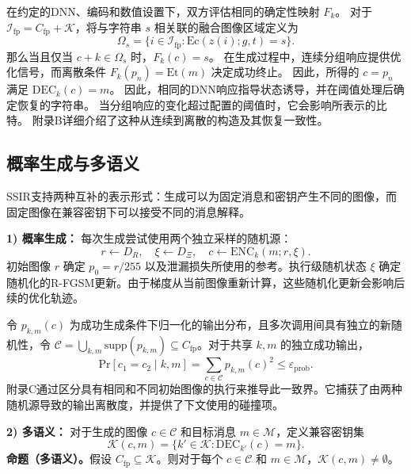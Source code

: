\documentclass[UTF8,a4paper,zihao=-4,fontset=windows,openany]{ctexbook}
\begin{document}
在约定的DNN、编码和数值设置下，双方评估相同的确定性映射 \(F_k\)。
对于 \(\mathcal{I}_{\mathrm{fp}} = C_{\mathrm{fp}} + \mathcal{K}\)，将与字符串 \(s\) 相关联的融合图像区域定义为
\begin{equation}
\Omega_s = \{ i \in \mathcal{I}_{\mathrm{fp}} : \mathrm{Ec}(z(i); g, t) = s \}.
\end{equation}
那么当且仅当 \(c + k \in \Omega_s\) 时，\(F_k(c) = s\)。
在生成过程中，连续分组响应提供优化信号，而离散条件 \(F_k(p_n) = \mathrm{Et}(m)\) 决定成功终止。
因此，所得的 \(c = p_n\) 满足 \(\mathrm{DEC}_k(c) = m\)。
因此，相同的DNN响应指导状态诱导，并在阈值处理后确定恢复的字符串。
当分组响应的变化超过配置的阈值时，它会影响所表示的比特。
附录B详细介绍了这种从连续到离散的构造及其恢复一致性。

\subsection{概率生成与多语义}

SSIR支持两种互补的表示形式：生成可以为固定消息和密钥产生不同的图像，而固定图像在兼容密钥下可以接受不同的消息解释。

\textbf{1) 概率生成：}
每次生成尝试使用两个独立采样的随机源：
\begin{equation}
r \leftarrow D_R, \quad \xi \leftarrow D_\Xi, \quad c \leftarrow \mathrm{ENC}_k(m; r, \xi). \tag{13}
\end{equation}
初始图像 \(r\) 确定 \(p_0 = r/255\) 以及泄漏损失所使用的参考。执行级随机状态 \(\xi\) 确定随机化的R-FGSM更新。由于梯度从当前图像重新计算，这些随机化更新会影响后续的优化轨迹。

令 \(p_{k,m}(c)\) 为成功生成条件下归一化的输出分布，且多次调用间具有独立的新随机性，令 \(\mathcal{C} = \bigcup_{k,m} \mathrm{supp}(p_{k,m}) \subseteq C_{\mathrm{fp}}\)。对于共享 \(k, m\) 的独立成功输出，
\begin{equation}
\mathrm{Pr}[c_1 = c_2 \mid k, m] = \sum_{c \in \mathcal{C}} p_{k,m}(c)^2 \le \varepsilon_{\mathrm{prob}}. \tag{14}
\end{equation}
附录C通过区分具有相同和不同初始图像的执行来推导此一致界。它捕获了由两种随机源导致的输出离散度，并提供了下文使用的碰撞项。

\textbf{2) 多语义：}
对于生成的图像 \(c \in \mathcal{C}\) 和目标消息 \(m \in \mathcal{M}\)，定义兼容密钥集
\begin{equation}
\mathcal{K}(c, m) = \{ k' \in \mathcal{K} : \mathrm{DEC}_{k'}(c) = m \}. \tag{15}
\end{equation}
\textbf{命题（多语义）。}假设 \(C_{\mathrm{fp}} \subseteq \mathcal{K}\)。则对于每个 \(c \in \mathcal{C}\) 和 \(m \in \mathcal{M}\)，\(\mathcal{K}(c, m) \neq \emptyset\)。
\end{document}

